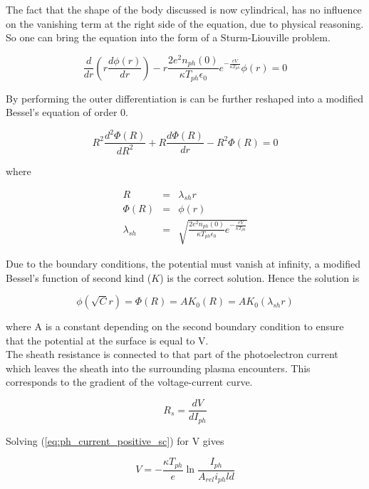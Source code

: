 \documentclass[a4paper,11pt]{thesis}
\begin{document}
The fact that the shape of the body discussed is now cylindrical, has no influence on the vanishing term at the right side of the equation, due to physical reasoning. So one can bring the equation into the form of a Sturm-Liouville problem.

\begin{equation}\label{eq:sturm-liouville}
   \frac{d}{dr}\left( r\frac{d \phi(r)}{dr}\right)-r\frac{2e^2 n_{ph}(0)}{\kappa T_{ph} \epsilon_0} e^{-\frac{eV}{\kappa T_{ph}}}\phi(r) =0
\end{equation}

By performing the outer differentiation is can be further reshaped into a modified Bessel's equation of order 0.

\begin{equation}\label{eq:bessel_de}
   R^2\frac{d^2 \Phi(R)}{dR^2}+ R\frac{d \Phi(R)}{dr} -R^2 \Phi(R) =0
\end{equation}

where

\begin{eqnarray}
    R&=&\lambda_{sh}r\\
    \Phi(R)&=&\phi(r)\\
    \lambda_{sh}&=&\sqrt{\frac{2e^2 n_{ph}(0)}{\kappa T_{ph} \epsilon_0} e^{-\frac{eV}{\kappa T_{ph}}}}
\end{eqnarray}

Due to the boundary conditions, the potential must vanish at infinity, a modified Bessel's function of second kind ($K$) is the correct solution. Hence the solution is

\begin{equation}
    \phi(\sqrt{C}r)=\Phi(R)=A K_0(R)=A K_0(\lambda_{sh}r)
\end{equation}

where A is a constant depending on the second boundary condition to ensure that the potential at the surface is equal to V.\\


The sheath resistance is connected to that part of the photoelectron current which leaves the sheath into the surrounding plasma encounters. This corresponds to the gradient of the voltage-current curve.

\begin{equation}
    R_s=\frac{dV}{dI_{ph}}
\end{equation}

Solving (\ref{eq:ph_current_positive_sc}) for V gives

\begin{equation}
V = -\frac{\kappa T_{ph}}{e} \ln{ \frac{I_{ph}}{A_{rel} i_{ph}ld}}
\end{equation}
\end{document}
